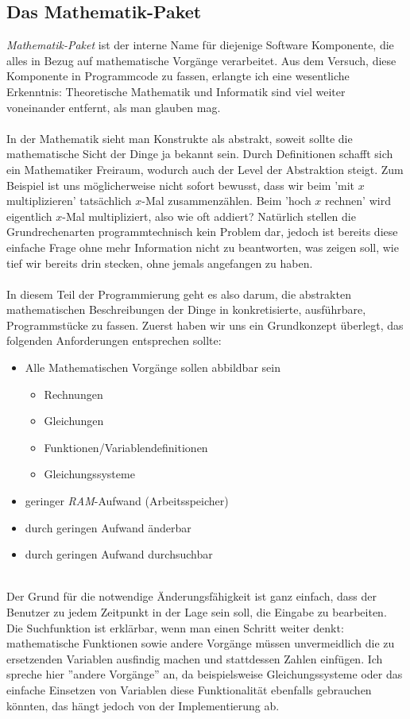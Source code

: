 \subsection{Das Mathematik-Paket}
\textit{Mathematik-Paket} ist der interne Name für diejenige Software Komponente, die alles in Bezug auf mathematische Vorgänge verarbeitet. Aus dem Versuch, diese Komponente in Programmcode zu fassen, erlangte ich eine wesentliche Erkenntnis: Theoretische Mathematik und Informatik sind viel weiter voneinander entfernt, als man glauben mag.\\\\
In der Mathematik sieht man Konstrukte als abstrakt, soweit sollte die mathematische Sicht der Dinge ja bekannt sein. Durch Definitionen schafft sich ein Mathematiker Freiraum, wodurch auch der Level der Abstraktion steigt. Zum Beispiel ist uns möglicherweise nicht sofort bewusst, dass wir beim 'mit $x$ multiplizieren' tatsächlich $x$-Mal zusammenzählen. Beim 'hoch $x$ rechnen' wird eigentlich $x$-Mal multipliziert, also wie oft addiert? Natürlich stellen die Grundrechenarten programmtechnisch kein Problem dar, jedoch ist bereits diese einfache Frage ohne mehr Information nicht zu beantworten, was zeigen soll, wie tief wir bereits drin stecken, ohne jemals angefangen zu haben.\\\\
In diesem Teil der Programmierung geht es also darum, die abstrakten mathematischen Beschreibungen der Dinge in konkretisierte, ausführbare, Programmstücke zu fassen. Zuerst haben wir uns ein Grundkonzept überlegt, das folgenden Anforderungen entsprechen sollte:\\
\begin{itemize}
	\item Alle Mathematischen Vorgänge sollen abbildbar sein
	\begin{itemize}
		\item Rechnungen
		\item Gleichungen
		\item Funktionen/Variablendefinitionen
		\item Gleichungssysteme
	\end{itemize}
	\item geringer \textit{RAM}-Aufwand (Arbeitsspeicher)
	\item durch geringen Aufwand änderbar
	\item durch geringen Aufwand durchsuchbar
\end{itemize}
\ \\
Der Grund für die notwendige Änderungsfähigkeit ist ganz einfach, dass der Benutzer zu jedem Zeitpunkt in der Lage sein soll, die Eingabe zu bearbeiten. Die Suchfunktion ist erklärbar, wenn man einen Schritt weiter denkt: mathematische Funktionen sowie andere Vorgänge müssen unvermeidlich die zu ersetzenden Variablen ausfindig machen und stattdessen Zahlen einfügen. Ich spreche hier ''andere Vorgänge'' an, da beispielsweise Gleichungssysteme oder das einfache Einsetzen von Variablen diese Funktionalität ebenfalls gebrauchen könnten, das hängt jedoch von der Implementierung ab.\\
